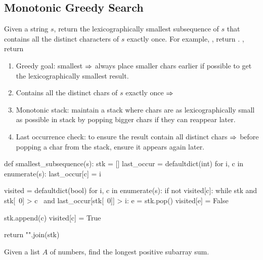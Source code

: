 \subsection{Monotonic Greedy Search}
 Given a string $s$, return the lexicographically smallest subsequence of $s$ that contains all the distinct characters of $s$ exactly once. For example, , return . , return 

\begin{enumerate}
\item Greedy goal: smallest $\Rightarrow$ always place smaller chars earlier if possible to get the lexicographically smallest result.
\item Contains all the distinct chars of $s$ exactly once $\Rightarrow$ 
\item Monotonic stack: maintain a stack where chars are as lexicographically small as possible in stack by popping bigger chars if they can reappear later.
\item Last occurrence check: to ensure the result contain all distinct chars $\Rightarrow$ before popping a char from the stack, ensure it appears again later.
\end{enumerate}
\begin{python}
def smallest_subsequence(s):
    stk = []
    last_occur = defaultdict(int)
    for i, c in enumerate(s):
        last_occur[c] = i
    
    visited = defaultdict(bool)
    for i, c in enumerate(s):
        if not visited[c]:
            while stk and stk[~0] > c \
                and last_occur[stk[~0]] > i:
                e = stk.pop()
                visited[e] = False

            stk.append(c)
            visited[c] = True
    
    return "".join(stk)
\end{python}


 Given a list $A$ of numbers, find the longest positive subarray sum. 

